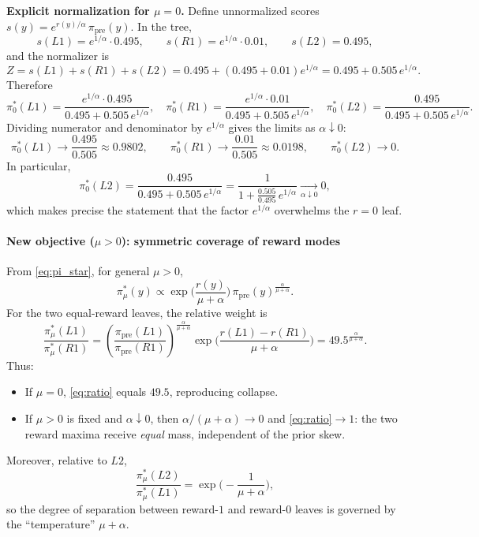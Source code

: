 \documentclass[11pt]{article}
\begin{document}
\medskip
\noindent\textbf{Explicit normalization for $\mu=0$.}
Define unnormalized scores $s(y)=e^{r(y)/\alpha}\,\pi_{\mathrm{pre}}(y)$. In the tree,
\[
s(L1)=e^{1/\alpha}\cdot 0.495,\qquad s(R1)=e^{1/\alpha}\cdot 0.01,\qquad s(L2)=0.495,
\]
and the normalizer is
\[
Z=s(L1)+s(R1)+s(L2)=0.495 + (0.495+0.01)e^{1/\alpha}=0.495+0.505\,e^{1/\alpha}.
\]
Therefore
\[
\pi^*_0(L1)=\frac{e^{1/\alpha}\cdot 0.495}{0.495+0.505\,e^{1/\alpha}},\quad
\pi^*_0(R1)=\frac{e^{1/\alpha}\cdot 0.01}{0.495+0.505\,e^{1/\alpha}},\quad
\pi^*_0(L2)=\frac{0.495}{0.495+0.505\,e^{1/\alpha}}.
\]
Dividing numerator and denominator by $e^{1/\alpha}$ gives the limits as $\alpha\downarrow 0$:
\[
\pi^*_0(L1)\to \frac{0.495}{0.505}\approx 0.9802,\qquad
\pi^*_0(R1)\to \frac{0.01}{0.505}\approx 0.0198,\qquad
\pi^*_0(L2)\to 0.
\]
In particular,
\[
\pi^*_0(L2)=\frac{0.495}{0.495+0.505\,e^{1/\alpha}}
=\frac{1}{1+\frac{0.505}{0.495}\,e^{1/\alpha}} \xrightarrow[\alpha\downarrow 0]{} 0,
\]
which makes precise the statement that the factor $e^{1/\alpha}$ overwhelms the $r=0$ leaf.

\paragraph{New objective ($\mu>0$): symmetric coverage of reward modes}
From \eqref{eq:pi_star}, for general $\mu>0$,
\[
\pi^*_\mu(y)\propto
\exp\!\Big(\frac{r(y)}{\mu+\alpha}\Big)\,
\pi_{\mathrm{pre}}(y)^{\frac{\alpha}{\mu+\alpha}}.
\]
For the two equal-reward leaves, the relative weight is
\begin{equation}\label{eq:ratio}
\frac{\pi^*_\mu(L1)}{\pi^*_\mu(R1)}
= \left(\frac{\pi_{\mathrm{pre}}(L1)}{\pi_{\mathrm{pre}}(R1)}\right)^{\!\frac{\alpha}{\mu+\alpha}}
\exp\!\Big(\frac{r(L1)-r(R1)}{\mu+\alpha}\Big)
= 49.5^{\frac{\alpha}{\mu+\alpha}}.
\end{equation}
Thus:
\begin{itemize}
  \item If $\mu=0$, \eqref{eq:ratio} equals $49.5$, reproducing collapse.
  \item If $\mu>0$ is fixed and $\alpha\downarrow 0$, then $\alpha/(\mu+\alpha)\to 0$ and \eqref{eq:ratio}$\to 1$:
        the two reward maxima receive \emph{equal} mass, independent of the prior skew.
\end{itemize}
Moreover, relative to $L2$,
\[
\frac{\pi^*_\mu(L2)}{\pi^*_\mu(L1)}=
\exp\!\Big(\!-\frac{1}{\mu+\alpha}\Big),
\]
so the degree of separation between reward-$1$ and reward-$0$ leaves is governed by the ``temperature'' $\mu+\alpha$.
\end{document}
